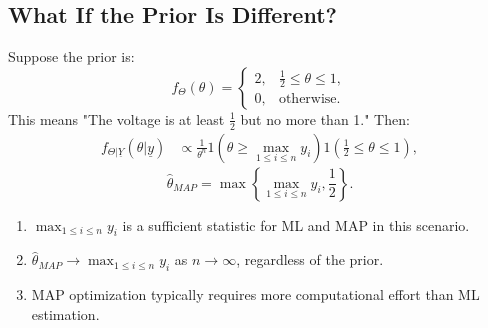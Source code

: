 \subsection*{What If the Prior Is Different?}
Suppose the prior is:
\[
f_\Theta(\theta) =
\begin{cases}
    2, & \frac{1}{2} \leq \theta \leq 1, \\
    0, & \text{otherwise}.
\end{cases}
\]
This means "The voltage is at least $\frac{1}{2}$ but no more than 1." Then:
\begin{align*}
f_{\Theta|\underline{Y}}(\theta|\underline{y}) &\propto \frac{1}{\theta^n} 1(\theta \geq \max_{1 \leq i \leq n} y_i) 1\left(\frac{1}{2} \leq \theta \leq 1\right),
\end{align*}
\[
\hat{\theta}_{MAP} = \max \left\{\max_{1 \leq i \leq n} y_i, \frac{1}{2}\right\}.
\]

\begin{notes}
    \begin{enumerate}
        \item $\max_{1 \leq i \leq n} y_i$ is a sufficient statistic for ML and MAP in this scenario.
        \item $\hat{\theta}_{MAP} \to \max_{1 \leq i \leq n} y_i$ as $n \to \infty$, regardless of the prior.
        \item MAP optimization typically requires more computational effort than ML estimation.
    \end{enumerate}
\end{notes}